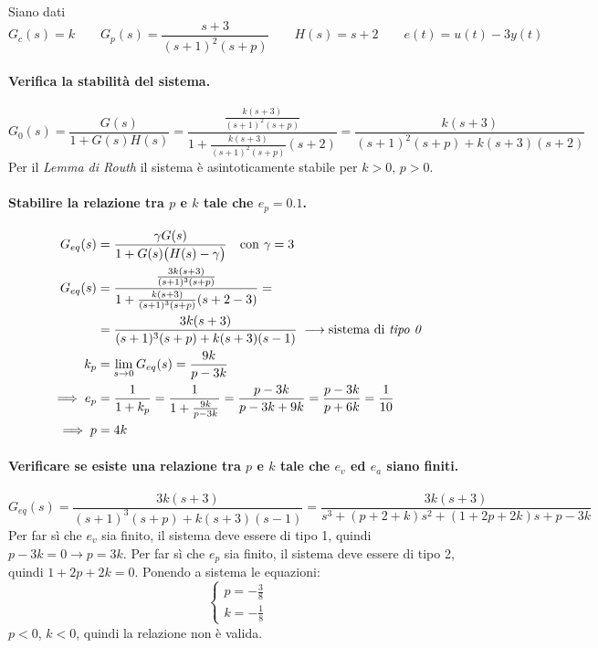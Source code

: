 \begin{esercizio}
Siano dati
\[
	G_c(s) = k \qquad G_p(s) = \frac{s+3}{(s+1)^2(s+p)} \qquad
	H(s) = s+2 \qquad e(t) = u(t) -3y(t)
\]

\paragraph{Verifica la stabilità del sistema.}
\[
	G_0(s) = \frac{G(s)}{1+G(s)H(s)} =
		\frac{\frac{k(s+3)}{(s+1)^2(s+p)}}{1+\frac{k(s+3)}{(s+1)^2(s+p)}(s+2)} =
		\frac{k(s+3)}{(s+1)^2(s+p)+k(s+3)(s+2)}
\]
Per il \emph{Lemma di Routh} il sistema è asintoticamente stabile per \(k>0,\,p>0\).

\paragraph{Stabilire la relazione tra \(p\) e \(k\) tale che \(e_p = 0.1\).}
\begin{align*}
	G_{eq}(s) &= \frac{\gamma G(s)}{1+G(s) \bigl(H(s) - \gamma\bigr)} \quad
			\text{con } \gamma = 3 \\
	G_{eq}(s) &= \frac{\frac{3k(s+3)}{(s+1)^3(s+p)}}{1+\frac{k(s+3)}{(s+1)^3(s+p)}(s+2-3)} = \\
		  &= \frac{3k(s+3)}{(s+1)^3(s+p)+k(s+3)(s-1)} \;
			\longrightarrow \text{sistema di \emph{tipo 0}} \\
	k_p &= \lim_{s\to0} G_{eq}(s) = \frac{9k}{p-3k} \\
	\implies e_p &= \frac{1}{1+k_p} = \frac{1}{1+\frac{9k}{p-3k}} = \frac{p-3k}{p-3k+9k} = \frac{p-3k}{p+6k} = \frac{1}{10} \\
	\implies p &= 4k
\end{align*}

\paragraph{Verificare se esiste una relazione tra \(p\) e \(k\) tale che \(e_v\) ed \(e_a\) siano finiti.}
\[
	G_{eq}(s) = \frac{3k(s+3)}{(s+1)^3(s+p)+k(s+3)(s-1)} = \frac{3k(s+3)}{s^3 +(p+2+k)s^2 +(1+2p+2k)s +p-3k}
\]
Per far sì che \(e_v\) sia finito, il sistema deve essere di tipo 1, quindi \(p-3k=0 \rightarrow p = 3k\). Per far sì che \(e_p\) sia finito, il sistema deve essere di tipo 2, quindi \(1+2p+2k=0\). Ponendo a sistema le equazioni:
\[\begin{cases}
	p = -\frac{3}{8} \\
	k = -\frac{1}{8}
\end{cases}\]
\(p<0\), \(k<0\), quindi la relazione non è valida.
\end{esercizio}

